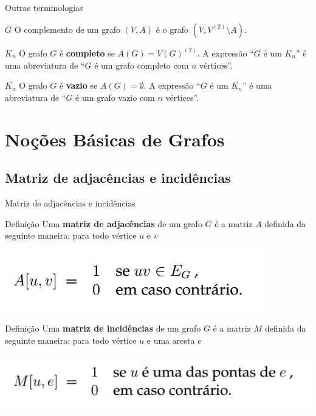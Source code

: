 \documentclass[xcolor=dvipsnames,table]{beamer}
\begin{document}
	\begin{frame}{Outras terminologias}
		\begin{block}{$\overline{G}$}
			O complemento de um grafo $(V, A)$ é o grafo $(V, V^{(2)} \setminus A)$.
		\end{block}
		
		\begin{block}{$K_n$} 
			O grafo $G$ é {\bf completo} se $A(G) = V(G)^{(2)}$. A expressão ``$G$ é um $K_n$'' é uma abreviatura de ``$G$ é um grafo completo com $n$ vértices''.
		\end{block}
		
		\begin{block}{$\overline{K_n}$} 
			O grafo $G$ é {\bf vazio} se $A(G) =\emptyset$. A expressão ``$G$ é um $\overline{K_n}$'' é uma abreviatura de ``$G$ é um grafo vazio com $n$ vértices''.
		\end{block}
	\end{frame}
    
    \section{Noções Básicas de Grafos}
    \subsection{Matriz de adjacências e incidências}
	\begin{frame}{Matriz de adjacências e incidências}
		\begin{block}{Definição}
			Uma {\bf matriz de adjacências} de um grafo $G$ é a matriz $A$ definida da seguinte maneira: para todo vértice $u$ e $v$
			\begin{center}
				\includegraphics[width=.5\textwidth]{images/adjacencia.png}
			\end{center}
		\end{block} \pause
		\begin{block}{Definição}
			Uma {\bf matriz de incidências} de um grafo $G$ é a matriz $M$ definida da seguinte maneira: para todo vértice $u$ e uma aresta $e$
			\begin{center}
				\includegraphics[width=.6\textwidth]{images/incidencia.png}
			\end{center}
		\end{block}
	\end{frame}
    
\end{document}
